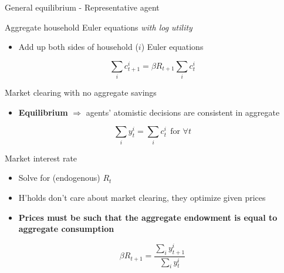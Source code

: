 \begin{frame}{General equilibrium - Representative agent}

Aggregate household Euler equations \emph{with log utility}
	\begin{itemize}
	\item	Add up both sides of household ($i$) Euler equations
	\end{itemize}
\begin{equation*}
\sum_{i}c_{t+1}^{i}=\beta R_{t+1}\sum_{i}c_{t}^{i}
\end{equation*}

Market clearing with no aggregate savings
\begin{itemize}
\item	\textbf{Equilibrium} $\Rightarrow$ agents' atomistic decisions are consistent in aggregate
\end{itemize}
\begin{equation*}
\sum_{i}y_{t}^{i}=\sum_{i}c_{t}^{i}\ \ \text{for }\forall t
\end{equation*}

Market interest rate
\begin{itemize}
\item	Solve for (endogenous) $R_{t}$
\item	H'holds don't care about market clearing, they optimize given prices
\item	\textbf{Prices must be such that the aggregate endowment is equal to aggregate consumption}
\end{itemize}
\begin{equation*}
\beta R_{t+1}=\frac{\sum_{i}y_{t+1}^{i}}{\sum_{i}y_{t}^{i}}
\end{equation*}

\end{frame}


